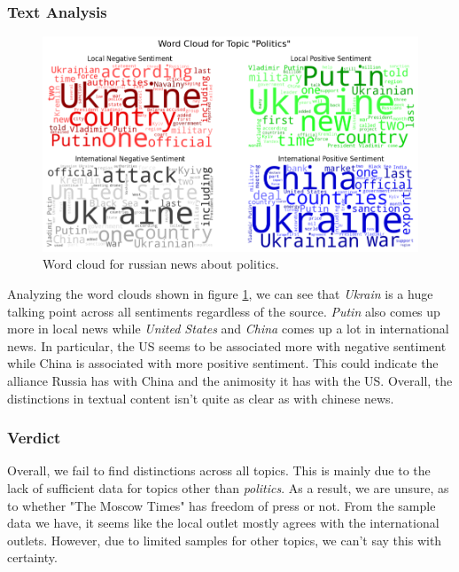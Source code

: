 \documentclass{article}
\theoremstyle{mytheoremstyle}
\theoremstyle{mytheoremstyle}
\theoremstyle{myproblemstyle}
\begin{document}
    \subsubsection{Text Analysis}

    \begin{figure}[h]
        \centering
        \includegraphics[width=\linewidth]{../images/plots/Russia/russia_wordcloud_politics.png}
        \caption{Word cloud for russian news about politics.}
        \label{fig:russian_sentiment_score_wordcloud}
    \end{figure}

    Analyzing the word clouds shown in figure \ref{fig:russian_sentiment_score_wordcloud}, we can see that \emph{Ukrain} is a huge talking point across all sentiments regardless of the source. \emph{Putin} also comes up more in local news while \emph{United States} and \emph{China} comes up a lot in international news. In particular, the US seems to be associated more with negative sentiment while China is associated with more positive sentiment. This could indicate the alliance Russia has with China and the animosity it has with the US. Overall, the distinctions in textual content isn't quite as clear as with chinese news.

    \subsubsection{Verdict}

    Overall, we fail to find distinctions across all topics. This is mainly due to the lack of sufficient data for topics other than \emph{politics}. As a result, we are unsure, as to whether "The Moscow Times" has freedom of press or not. From the sample data we have, it seems like the local outlet mostly agrees with the international outlets. However, due to limited samples for other topics, we can't say this with certainty.
\end{document}
